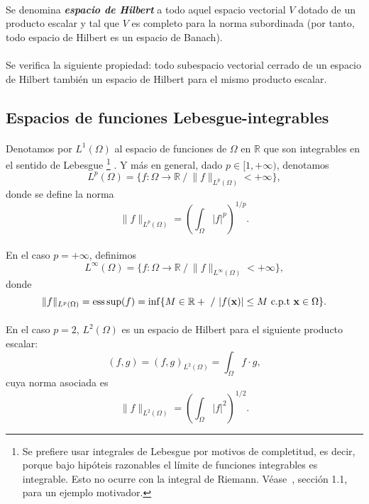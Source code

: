 \documentclass[11pt]{article}
\theoremstyle{plain}
\theoremstyle{definition}
\newcounter{stepnum}[section]
\newcommand{\step}[1][]{\bigskip\noindent\textbf{\thesection.\refstepcounter{stepnum}\thestepnum}.\enspace{#1}}
\renewcommand{\step}[1][]{\paragraph{#1}\hspace{-1.1em}}
\newcommand{\deff}[1]{\textit{\textbf{#1}}}
\newcommand{\R}{\ensuremath{\mathbb{R}}}
\newcommand{\xx}{\ensuremath{\mathbf{x}}\xspace}
\newcommand{\norm}[2][]{\ensuremath{\|#2\|_{#1}}}
\begin{document}
\step 
Se denomina \deff{espacio de Hilbert} a todo aquel espacio vectorial $V$ dotado de un producto escalar y tal que $V$ es completo para la norma subordinada (por tanto, todo espacio de Hilbert es un espacio de Banach). 

\step 
Se verifica la siguiente propiedad: todo subespacio vectorial cerrado de un espacio de Hilbert también un espacio de Hilbert para el mismo producto escalar. 

\subsection*{Espacios de funciones Lebesgue-integrables}

\step 
Denotamos por $L^1(\Omega)$ al espacio de funciones de $\Omega$ en $\R$ que son integrables en el sentido de Lebesgue%
\footnote{Se prefiere usar integrales de Lebesgue por motivos de completitud, es decir, porque bajo hipóteis razonables el límite de funciones integrables es integrable. Esto no ocurre con la integral de Riemann. Véase~\cite{Brenner-Scott:08}, sección 1.1, para un ejemplo motivador.}
%
. Y más en general, dado $p\in [1,+\infty)$, denotamos
\begin{equation*}
  L^p(\Omega) = \big\{ f:\Omega \to \R \ /\ \norm[L^p(\Omega)]{f} < +\infty \big\},
\end{equation*}
donde se define la norma
\begin{equation*}
  \norm[L^p(\Omega)]{f} = \left(\int_\Omega |f|^p\right)^{1/p}.
\end{equation*}

\step
En el caso $p=+\infty$, definimos
\begin{equation*}
  L^\infty(\Omega) = \big\{ f:\Omega \to \R \ /\ \norm[L^\infty(\Omega)]{f} < +\infty \big\},
\end{equation*}
donde
\begin{equation*}
  \norm[L^p(\Omega)]{f} = \mathop{\rm ess\hspace{0.4ex}sup}(f) = \mathop{\rm inf} \{M\in\R+ \ /\ |f(\xx)| \le M \ \text{c.p.t}\ \xx\in\Omega \}.
\end{equation*}

\step 
En el caso $p=2$, $L^2(\Omega)$ es un espacio de Hilbert para el siguiente producto escalar:
\begin{equation}
  \label{producto.escalar.L2}
  (f,g) = (f,g)_{L^2(\Omega)} = \int_\Omega f\cdot g,
\end{equation}
cuya norma asociada es
\[
  \norm[L^2(\Omega)]{f} = \left(\int_\Omega |f|^2\right)^{1/2}.
\]
\end{document}
